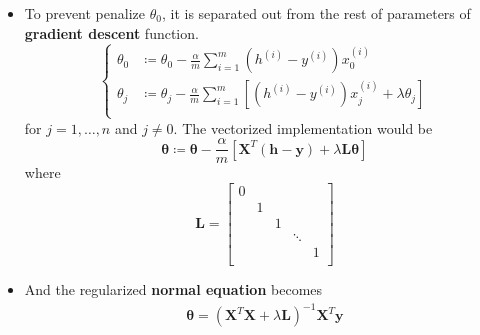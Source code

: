\begin{itemize}
    \item To prevent penalize $\theta_0$, it is separated out from the rest of parameters of \textbf{gradient descent} function. 
    \begin{equation}
        \left\{
        \begin{aligned}
            \theta_0 &\coloneqq \theta_0 - \frac{\alpha}{m} \sum_{i=1}^{m} {\left(h^{(i)} - y^{(i)}\right)x_0^{(i)}}\\
            \theta_j &\coloneqq \theta_j - \frac{\alpha}{m} \sum_{i=1}^{m} \left[ {\left( h^{(i)} - y^{(i)}\right)x_j^{(i)} + \lambda\theta_j} \right]\\
        \end{aligned}
        \right.
    \end{equation}
    for $j = 1, \dots, n$ and $j \neq 0$. The vectorized implementation would be
    \begin{equation}
        \mathbf{\theta} \coloneqq \mathbf{\theta} - \frac{\alpha}{m} \left[ \mathbf{X}^T \left(\mathbf{h} - \mathbf{y}\right) + \lambda\mathbf{L}\mathbf{\theta} \right]
    \end{equation}
    where
    \begin{equation}
        \mathbf{L} = 
        \left[
        \begin{matrix}
            0      &        &        &        &       \\
                   & 1      &        &        &       \\
                   &        & 1      &        &       \\
                   &        &        & \ddots &       \\
                   &        &        &        & 1     \\
        \end{matrix}
        \right]
    \end{equation}
    \item And the regularized \textbf{normal equation} becomes
    \begin{equation}\label{eqn:normalRegularized}
        \begin{split}
            \mathbf{\theta} = \left(\mathbf{X}^T\mathbf{X} + \lambda \mathbf{L}\right)^{-1}\mathbf{X}^T\mathbf{y}\\
        \end{split}
    \end{equation}


\end{itemize}
